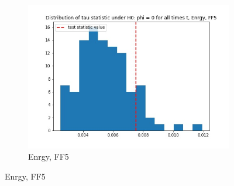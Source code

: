 \documentclass{article}
\begin{document}
\begin{figure}
\begin{subfigure}[b]{0.3\textwidth}
    \includegraphics[width=\textwidth]{Enrgy/tau_hist_02_FF5.jpg}
    \caption{Enrgy, FF5}
    \label{fig:2}
  \end{subfigure}
  \end{figure}
  
\end{document}
